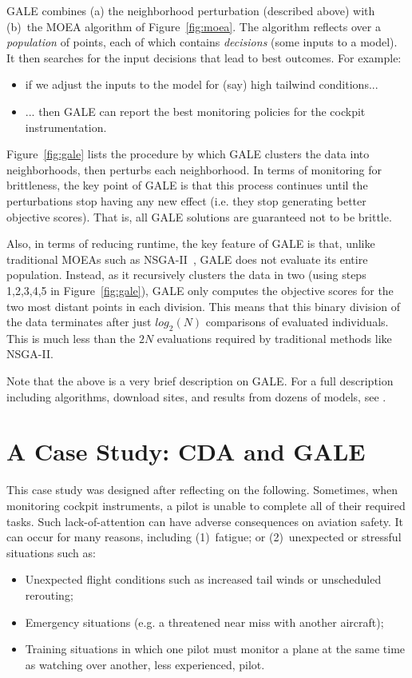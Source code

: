\documentclass[journal]{IEEEtran}
\newcommand{\bi}{\begin{itemize}}
\newcommand{\ei}{\end{itemize}}
\newcommand{\fig}[1]{Figure~\ref{fig:#1}}
\begin{document}
GALE combines (a) the neighborhood perturbation (described above) with (b)~the MOEA algorithm of \fig{moea}.
The algorithm reflects over a {\em population} of points, each of which contains {\em decisions} (some inputs to a  model).
It then searches for the input decisions that lead to best outcomes.
For example:
\begin{itemize}
\item
if we adjust the inputs to the model for (say) high tailwind conditions...
\item
... then GALE can report the best monitoring policies for the cockpit instrumentation.
\end{itemize}

\fig{gale} lists the procedure by which GALE clusters the data into neighborhoods, then perturbs each neighborhood.
In terms of monitoring for brittleness, the key point of GALE is that  this process continues until the perturbations stop having any new effect (i.e. they stop generating better objective scores). 
That is, all GALE solutions are guaranteed not to be brittle.


Also, in terms of reducing runtime, the key feature of GALE is that, unlike traditional MOEAs such as NSGA-II~\cite{deb00afast}, GALE does not evaluate its entire population.
Instead, as it recursively clusters the data in two (using steps 1,2,3,4,5 in \fig{gale}), GALE only computes the objective scores for the two most distant points in each division.  
This means that this binary division of the data terminates after just $log_2(N)$ comparisons of evaluated individuals. 
This is much less than the $2N$ evaluations required by  traditional methods like NSGA-II.

Note that the above is a very brief description on GALE. For a full description including algorithms, download sites, and results
from dozens of models, see \cite{galepaper,krallphd}.

\section{A Case Study:  CDA and GALE}\label{sec:case}

This case study was designed after reflecting on the following.
Sometimes, when monitoring cockpit instruments, a pilot is unable to complete all of their required tasks.
Such lack-of-attention can have adverse consequences on aviation safety.
It can occur for many reasons, including (1)~fatigue; or
(2)~unexpected or stressful situations such as:
\bi
\item 
Unexpected flight conditions such as increased tail winds or unscheduled rerouting;
\item
Emergency situations (e.g. a threatened near miss with another aircraft);
\item
Training situations in which one pilot must monitor a plane at the same time as watching over another, less experienced, pilot.
\ei
\end{document}
